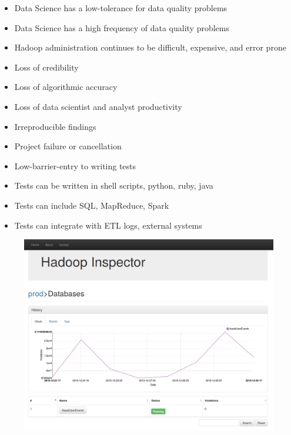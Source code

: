 \documentclass[12pt]{article} %
\begin{document}
\begin{minipage}[c]{.66\linewidth}


\begin{itemize}
\item Data Science has a low-tolerance for data quality problems
\item Data Science has a high frequency of data quality problems
\item Hadoop administration continues to be difficult, expensive, and error prone
\end{itemize}


\begin{itemize}
    \item Loss of credibility
    \item Loss of algorithmic accuracy
    \item Loss of data scientist and analyst productivity
    \item Irreproducible findings
    \item Project failure or cancellation
\end{itemize}


\begin{itemize}
    \item Low-barrier-entry to writing tests
    \item Tests can be written in shell scripts, python, ruby, java
    \item Tests can include SQL, MapReduce, Spark
    \item Tests can integrate with ETL logs, external systems
\end{itemize}

\vspace{1cm}

\begin{figure}[H]
\centering
\includegraphics[width=\textwidth]{screen1.png}
\end{figure}
\end{minipage}\hfill %
\end{document}
